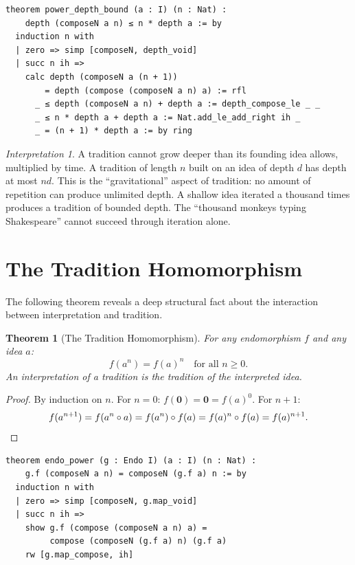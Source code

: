 \documentclass[11pt,openany]{book}
\theoremstyle{definition}
\theoremstyle{plain}
\newtheorem{theorem}[axiom]{Theorem}
\theoremstyle{remark}
\newtheorem{interpretation}[axiom]{Interpretation}
\newcommand{\compose}{\circ}                 %
\newcommand{\void}{\mathbf{0}}              %
\begin{document}
\begin{lstlisting}[language=Lean4]
theorem power_depth_bound (a : I) (n : Nat) :
    depth (composeN a n) ≤ n * depth a := by
  induction n with
  | zero => simp [composeN, depth_void]
  | succ n ih =>
    calc depth (composeN a (n + 1))
        = depth (compose (composeN a n) a) := rfl
      _ ≤ depth (composeN a n) + depth a := depth_compose_le _ _
      _ ≤ n * depth a + depth a := Nat.add_le_add_right ih _
      _ = (n + 1) * depth a := by ring
\end{lstlisting}

\begin{interpretation}
A tradition cannot grow deeper than its founding idea allows, multiplied by time. A tradition of length $n$ built on an idea of depth $d$ has depth at most $nd$. This is the ``gravitational'' aspect of tradition: no amount of repetition can produce unlimited depth. A shallow idea iterated a thousand times produces a tradition of bounded depth. The ``thousand monkeys typing Shakespeare'' cannot succeed through iteration alone.
\end{interpretation}

\section{The Tradition Homomorphism}

The following theorem reveals a deep structural fact about the interaction between interpretation and tradition.

\begin{theorem}[The Tradition Homomorphism]
\label{thm:tradition-hom}
For any endomorphism $f$ and any idea $a$:
\[
f(a^n) = f(a)^n \quad \text{for all } n \geq 0.
\]
An interpretation of a tradition is the tradition of the interpreted idea.
\end{theorem}

\begin{proof}
By induction on $n$. For $n = 0$: $f(\void) = \void = f(a)^0$. For $n + 1$:
\[
f(a^{n+1}) = f(a^n \compose a) = f(a^n) \compose f(a) = f(a)^n \compose f(a) = f(a)^{n+1}. \qedhere
\]
\end{proof}

\begin{lstlisting}[language=Lean4]
theorem endo_power (g : Endo I) (a : I) (n : Nat) :
    g.f (composeN a n) = composeN (g.f a) n := by
  induction n with
  | zero => simp [composeN, g.map_void]
  | succ n ih =>
    show g.f (compose (composeN a n) a) =
         compose (composeN (g.f a) n) (g.f a)
    rw [g.map_compose, ih]
\end{lstlisting}
\end{document}
